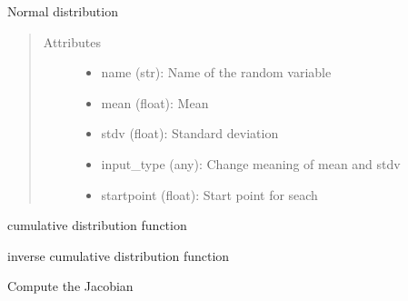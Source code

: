 \documentclass[letterpaper,10pt,english]{sphinxmanual}
\begin{document}
\begin{fulllineitems}
Normal distribution
\begin{quote}\begin{description}
\item[{Attributes }] \leavevmode\begin{itemize}
\item {} 
name (str):         Name of the random variable

\item {} 
mean (float):       Mean

\item {} 
stdv (float):       Standard deviation

\item {} 
input\_type (any):   Change meaning of mean and stdv

\item {} 
startpoint (float): Start point for seach

\end{itemize}

\end{description}\end{quote}


\begin{fulllineitems}
cumulative distribution function

\end{fulllineitems}



\begin{fulllineitems}
inverse cumulative distribution function

\end{fulllineitems}



\begin{fulllineitems}
Compute the Jacobian

\end{fulllineitems}




\end{fulllineitems}
\end{document}
